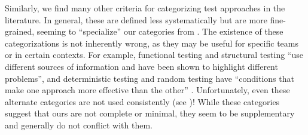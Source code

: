 \begin{itemize}
          Similarly, we find many other
          criteria for categorizing test approaches in the literature.
          In general, these are defined less systematically but are more
          fine-grained, seeming to ``specialize'' our categories from
          . The existence of these categorizations is not
          inherently wrong, as they may be useful for specific teams or in
          certain contexts. For example, functional testing and structural
          testing ``use different sources of information and have been shown to
          highlight different problems'', and deterministic testing and random
          testing have ``conditions that make one approach more effective than
          the other'' \citep[p.~5\=/16]{SWEBOK2024}. Unfortunately, even these
          alternate categories are not used consistently
          (see )! While these categories suggest
          that ours are not complete or minimal, they seem to be supplementary
          and generally do not conflict with them.
\end{itemize}

\begin{landscape}%
    \otherCatsTable{}%
\end{landscape}

